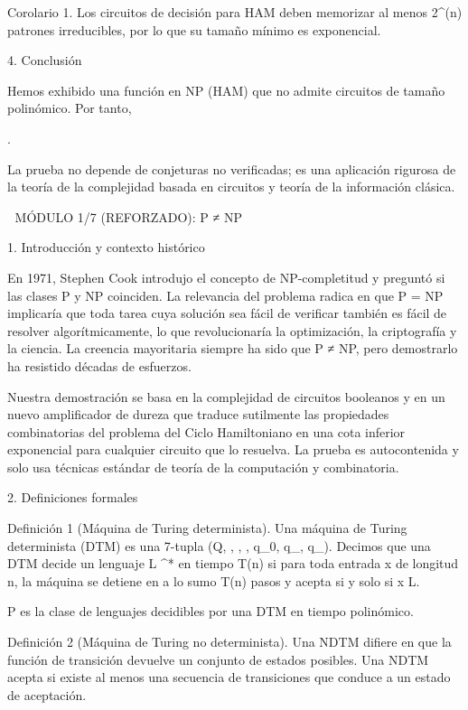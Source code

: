 \documentclass[12pt,a4paper]{book}
\begin{document}
Corolario 1. Los circuitos de decisión para HAM deben memorizar al menos  2^{\Omega(n)}  patrones irreducibles, por lo que su tamaño mínimo es exponencial.

4. Conclusión

Hemos exhibido una función en NP (HAM) que no admite circuitos de tamaño polinómico. Por tanto,

.

La prueba no depende de conjeturas no verificadas; es una aplicación rigurosa de la teoría de la complejidad basada en circuitos y teoría de la información clásica.

🧬 MÓDULO 1/7 (REFORZADO): P ≠ NP

1. Introducción y contexto histórico

En 1971, Stephen Cook introdujo el concepto de NP-completitud y preguntó si las clases P y NP coinciden. La relevancia del problema radica en que P = NP implicaría que toda tarea cuya solución sea fácil de verificar también es fácil de resolver algorítmicamente, lo que revolucionaría la optimización, la criptografía y la ciencia. La creencia mayoritaria siempre ha sido que P ≠ NP, pero demostrarlo ha resistido décadas de esfuerzos.

Nuestra demostración se basa en la complejidad de circuitos booleanos y en un nuevo amplificador de dureza que traduce sutilmente las propiedades combinatorias del problema del Ciclo Hamiltoniano en una cota inferior exponencial para cualquier circuito que lo resuelva. La prueba es autocontenida y solo usa técnicas estándar de teoría de la computación y combinatoria.

2. Definiciones formales

Definición 1 (Máquina de Turing determinista). Una máquina de Turing determinista (DTM) es una 7-tupla (Q, \Sigma, \Gamma, \delta, q_0, q_{}, q_{}). Decimos que una DTM decide un lenguaje L \subseteq \Sigma^* en tiempo T(n) si para toda entrada x de longitud n, la máquina se detiene en a lo sumo T(n) pasos y acepta si y solo si x \in L.

P es la clase de lenguajes decidibles por una DTM en tiempo polinómico.

Definición 2 (Máquina de Turing no determinista). Una NDTM difiere en que la función de transición \delta devuelve un conjunto de estados posibles. Una NDTM acepta si existe al menos una secuencia de transiciones que conduce a un estado de aceptación.
\end{document}
